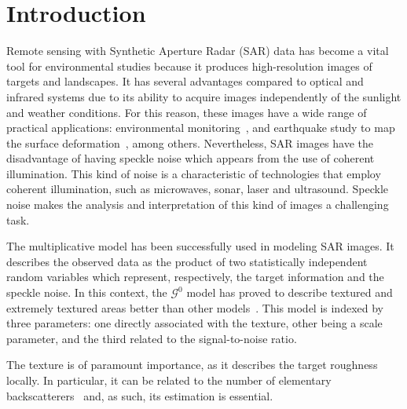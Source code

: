 \documentclass[twocolumn]{svjour3}
\begin{document}
\section{Introduction}
\label{intro}

Remote sensing with Synthetic Aperture Radar (SAR) data has become a vital tool for environmental studies because it produces high-resolution images of targets and landscapes. 
It  has  several  advantages  compared  to  optical  and  infrared systems due to its ability to acquire images independently of the sunlight and weather conditions. 
For this reason, these images have a wide range of practical applications: environmental monitoring~\cite{White1991,Brisco2013}, and
earthquake study to map the surface deformation~\cite{Yinghui2017}, among others.  
Nevertheless, SAR images have the disadvantage of having speckle noise which appears from the use of coherent illumination. 
This kind of noise is a characteristic of technologies that
employ coherent illumination, such as microwaves, sonar, laser and ultrasound. 
Speckle noise makes the analysis and interpretation of this kind of images a challenging task.

The multiplicative model has been successfully used in modeling SAR images.
It describes the observed data as the product of two statistically independent random variables which represent, respectively, the target information and the speckle noise. 
In this context, the $\mathcal{G}^0$ model has proved to describe textured and extremely textured areas better than other models~\cite{Frery97,MejailJacoboFreryBustos:IJRS}. 
This model is indexed by three parameters: 
one directly associated with the texture, 
other being a scale parameter, 
and the third related to the signal-to-noise ratio.

The texture is of paramount importance, as it describes the target roughness locally.
In particular, it can be related to the number of elementary backscatterers~\cite{AGeneralizedGaussianCoherentScattererModelforCorrelatedSARTexture} and, as such, its estimation is essential.
\end{document}

